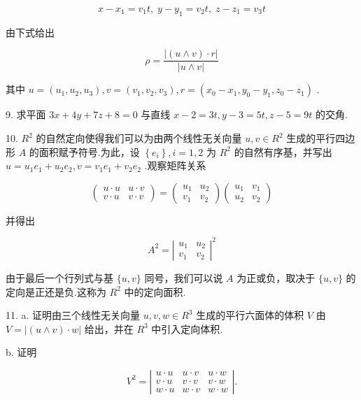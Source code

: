 \[
x - {x}_{1} = {v}_{1}t,\;y - {y}_{1} = {v}_{2}t,\;z - {z}_{1} = {v}_{3}t
\]

由下式给出

\[
\rho  = \frac{\left| \left( u \land  v\right)  \cdot  r\right| }{\left| u \land  v\right| }
\]

其中 \(u = \left( {{u}_{1},{u}_{2},{u}_{3}}\right) ,v = \left( {{v}_{1},{v}_{2},{v}_{3}}\right) ,r = \left( {{x}_{0} - {x}_{1},{y}_{0} - {y}_{1},{z}_{0} - {z}_{1}}\right)\) .

9. 求平面 \({3x} + {4y} + {7z} + 8 = 0\) 与直线 \(x - 2 = {3t},y - 3 = {5t},z - 5 = {9t}\) 的交角.

10. \({R}^{2}\) 的自然定向使得我们可以为由两个线性无关向量 \(u,v \in  {R}^{2}\) 生成的平行四边形 \(A\) 的面积赋予符号.为此，设 \(\left\{  {e}_{i}\right\}  ,i = 1,2\) 为 \({R}^{2}\) 的自然有序基，并写出 \(u = {u}_{1}{e}_{1} + {u}_{2}{e}_{2},v = {v}_{1}{e}_{1} + {v}_{2}{e}_{2}\) .观察矩阵关系

\[
\left( \begin{array}{ll} u \cdot  u & u \cdot  v \\  v \cdot  u & v \cdot  v \end{array}\right)  = \left( \begin{array}{ll} {u}_{1} & {u}_{2} \\  {v}_{1} & {v}_{2} \end{array}\right) \left( \begin{array}{ll} {u}_{1} & {v}_{1} \\  {u}_{2} & {v}_{2} \end{array}\right)
\]

并得出

\[
{A}^{2} = {\left| \begin{array}{ll} {u}_{1} & {u}_{2} \\  {v}_{1} & {v}_{2} \end{array}\right| }^{2}
\]

由于最后一个行列式与基 \(\{ u,v\}\) 同号，我们可以说 \(A\) 为正或负，取决于 \(\{ u,v\}\) 的定向是正还是负.这称为 \({R}^{2}\) 中的定向面积.

11. a. 证明由三个线性无关向量 \(u,v,w \in  {R}^{3}\) 生成的平行六面体的体积 \(V\) 由 \(V = \left| {\left( {u \land  v}\right)  \cdot  w}\right|\) 给出，并在 \({R}^{3}\) 中引入定向体积.

b. 证明

\[
{V}^{2} = \left| \begin{matrix} u \cdot  u & u \cdot  v & u \cdot  w \\  v \cdot  u & v \cdot  v & v \cdot  w \\  w \cdot  u & w \cdot  v & w \cdot  w \end{matrix}\right| .
\]

